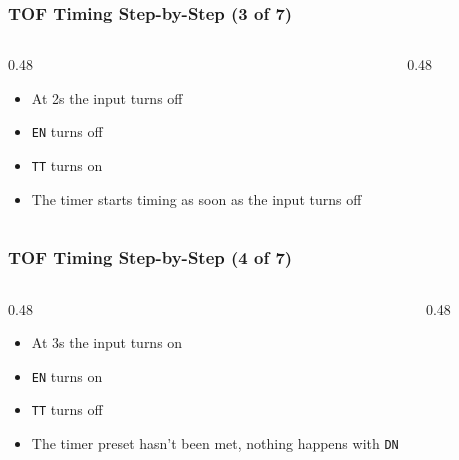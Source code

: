 \begin{frame}
    \frametitle{TOF Timing Step-by-Step (3 of 7)}

    \begin{columns}
        \begin{column}{0.48\linewidth}
            \begin{itemize}
                \item At 2s the input turns off
                \item \texttt{EN} turns off
                \item \texttt{TT} turns on
                \item The timer starts timing as soon as the input turns off
            \end{itemize}
        \end{column}
        \begin{column}{0.48\linewidth}
            \begin{figure}
                \centering
                \resizebox{\columnwidth}{!}{
                    
                }
            \end{figure}  
        \end{column}
    \end{columns}
\end{frame}

\begin{frame}
    \frametitle{TOF Timing Step-by-Step (4 of 7)}

    \begin{columns}
        \begin{column}{0.48\linewidth}
            \begin{itemize}
                \item At 3s the input turns on
                \item \texttt{EN} turns on
                \item \texttt{TT} turns off
                \item The timer preset hasn't been met, nothing happens with \texttt{DN}
            \end{itemize}
        \end{column}
        \begin{column}{0.48\linewidth}
            \begin{figure}
                \centering
                \resizebox{\columnwidth}{!}{
                    
                }
            \end{figure}  
        \end{column}
    \end{columns}
\end{frame}

